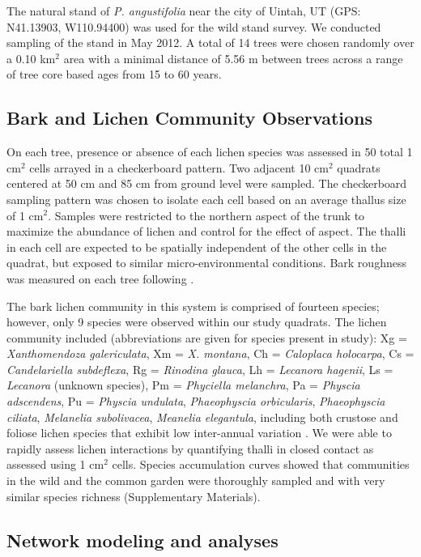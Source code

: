 \documentclass[fleqn,10pt]{wlscirep}
\begin{document}
The natural stand of \textit{P. angustifolia} near the city of Uintah,
UT (GPS:  N41.13903, W110.94400) was used for the wild stand
survey. We conducted sampling of the stand in May 2012. A total of 14
trees were chosen randomly over a 0.10 km$^2$ area with a minimal
distance of 5.56 m between trees across a range of tree core based
ages from 15 to 60 years.

\subsection*{Bark and Lichen Community Observations}

On each tree, presence or absence of each lichen species was assessed
in 50 total 1 cm$^2$ cells arrayed in a checkerboard pattern. Two
adjacent 10 cm$^2$ quadrats centered at 50 cm and 85 cm from ground
level were sampled. The checkerboard sampling pattern was chosen to
isolate each cell based on an average thallus size of 1
cm$^2$. Samples were restricted to the northern aspect of the trunk to
maximize the abundance of lichen and control for the effect of
aspect. The thalli in each cell are expected to be spatially
independent of the other cells in the quadrat, but exposed to similar
micro-environmental conditions. Bark roughness was measured on each
tree following \cite{Winfree2011}.

The bark lichen community in this system is comprised of fourteen
species; however, only 9 species were observed within our study
quadrats. The lichen community included (abbreviations are given for
species present in study): Xg = \textit{Xanthomendoza galericulata},
Xm = \textit{X. montana}, Ch = \textit{Caloplaca holocarpa}, Cs =
\textit{Candelariella subdeflexa}, Rg = \textit{Rinodina glauca}, Lh =
\textit{Lecanora hagenii}, Ls = \textit{Lecanora} (unknown species),
Pm = \textit{Phyciella melanchra}, Pa = \textit{Physcia adscendens},
Pu = \textit{Physcia undulata}, \textit{Phaeophyscia orbicularis},
\textit{Phaeophyscia ciliata}, \textit{Melanelia subolivacea},
\textit{Meanelia elegantula}, including both crustose and foliose
lichen species that exhibit low inter-annual variation
\cite{Lamit2011}. We were able to rapidly assess lichen interactions
by quantifying thalli in closed contact as assessed using 1 cm$^2$
cells. Species accumulation curves showed that communities in the wild
and the common garden were thoroughly sampled and with very similar
species richness (Supplementary Materials).


\subsection*{Network modeling and analyses}
\end{document}
